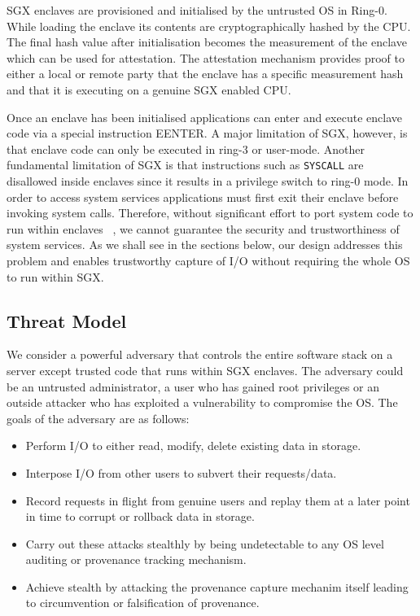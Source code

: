 \documentclass[withindex,glossary]{cam-thesis}
\begin{document}
SGX enclaves are provisioned and initialised by the untrusted OS in Ring-0.
While loading the enclave its contents are cryptographically hashed by the CPU.
The final hash value after initialisation becomes the measurement of the enclave which can be used for attestation.
The attestation mechanism provides proof to either a local or remote party that the enclave has a specific measurement hash and that it is executing on a genuine SGX enabled CPU.

Once an enclave has been initialised applications can enter and execute enclave code via a special instruction EENTER.
A major limitation of SGX, however, is that enclave code can only be executed in ring-3 or user-mode.
Another fundamental limitation of SGX is that instructions such as \texttt{SYSCALL} are disallowed inside enclaves since it results in a privilege switch to ring-0 mode.
In order to access system services applications must first exit their enclave before invoking system calls.
Therefore, without significant effort to port system code to run within enclaves ~\cite{haeven}, we cannot guarantee the security and trustworthiness of system services.
As we shall see in the sections below, our design addresses this problem and enables trustworthy capture of I/O without requiring the whole OS to run within SGX.

\subsection{Threat Model}
We consider a powerful adversary that controls the entire software stack on a server except trusted code that runs within SGX enclaves.
The adversary could be an untrusted administrator, a user who has gained root privileges or an outside attacker who has exploited a vulnerability to compromise the OS.
The goals of the adversary are as follows:
\begin{itemize}
\item Perform I/O to either read, modify, delete existing data in storage.
\item Interpose I/O from other users to subvert their requests/data.
\item Record requests in flight from genuine users and replay them at a later point in time to corrupt or rollback data in storage.
\item Carry out these attacks stealthly by being undetectable to any OS level auditing or provenance tracking mechanism.
\item Achieve stealth by attacking the provenance capture mechanim itself leading to circumvention or falsification of provenance.
\end{itemize}
\end{document}
